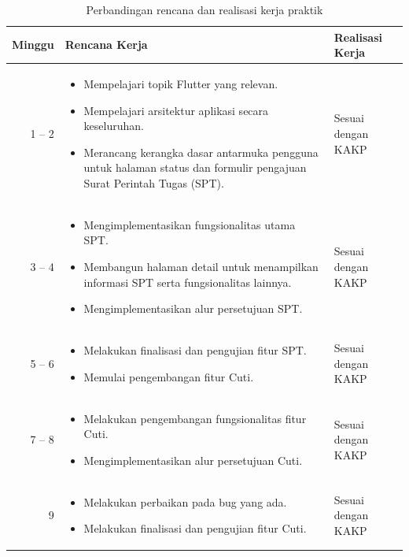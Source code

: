 \begin{table}[H]
\centering
\caption{Perbandingan rencana dan realisasi kerja praktik}
\label{tab:kakp}
\begin{tabular}{|r|p{7cm}|p{4cm}|}
\hline
\textbf{Minggu} & \textbf{Rencana Kerja} & \textbf{Realisasi Kerja} \\
\hline
1 -- 2 & 
\begin{itemize}[leftmargin=*, nosep]
    \item Mempelajari topik Flutter yang relevan.
    \item Mempelajari arsitektur aplikasi secara keseluruhan.
    \item Merancang kerangka dasar antarmuka pengguna untuk halaman status dan formulir pengajuan Surat Perintah Tugas (SPT).
\end{itemize} & Sesuai dengan KAKP \\
\hline
3 -- 4 & 
\begin{itemize}[leftmargin=*, nosep]
    \item Mengimplementasikan fungsionalitas utama SPT.
    \item Membangun halaman detail untuk menampilkan informasi SPT serta fungsionalitas lainnya.
    \item Mengimplementasikan alur persetujuan SPT.
\end{itemize} & Sesuai dengan KAKP \\
\hline
5 -- 6 & 
\begin{itemize}[leftmargin=*, nosep]
    \item Melakukan finalisasi dan pengujian fitur SPT.
    \item Memulai pengembangan fitur Cuti.
\end{itemize} & Sesuai dengan KAKP \\
\hline
7 -- 8 & 
\begin{itemize}[leftmargin=*, nosep]
    \item Melakukan pengembangan fungsionalitas fitur Cuti.
    \item Mengimplementasikan alur persetujuan Cuti.
\end{itemize} & Sesuai dengan KAKP \\
\hline
9 & 
\begin{itemize}[leftmargin=*, nosep]
    \item Melakukan perbaikan pada bug yang ada.
    \item Melakukan finalisasi dan pengujian fitur Cuti.
\end{itemize} & Sesuai dengan KAKP \\
\hline
\end{tabular}
\end{table}

